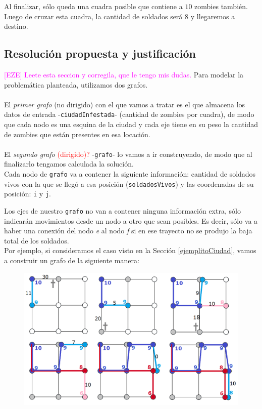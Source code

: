 Al finalizar, s\'olo queda una cuadra posible que contiene a $10$ zombies tambi\'en. Luego de cruzar esta cuadra, la cantidad de soldados ser\'a $8$ y llegaremos a destino.



\newpage
\subsection{Resoluci\'on propuesta y justificaci\'on}

\textcolor{magenta}{[EZE] Leete esta seccion y corregila, que le tengo mis dudas. }Para modelar la problem\'atica planteada, utilizamos dos grafos.\\
\\

El \emph{primer grafo} (no dirigido) con el que vamos a tratar es el que almacena los datos de entrada -\texttt{ciudadInfestada}- (cantidad de zombies por cuadra), de modo que cada nodo es una esquina de la ciudad y cada eje tiene en su peso la cantidad de zombies que est\'an presentes en esa locaci\'on.\\
\\

El \emph{segundo grafo} \textcolor{red}{(dirigido)?} -\texttt{grafo}- lo vamos a ir construyendo, de modo que al finalizarlo tengamos calculada la soluci\'on.\\

Cada nodo de \texttt{grafo} va a contener la siguiente informaci\'on: cantidad de soldados vivos con la que se lleg\'o a esa posici\'on (\texttt{soldadosVivos}) y las coordenadas de su posici\'on: \texttt{i} y \texttt{j}.

Los ejes de nuestro \texttt{grafo} no van a contener ninguna informaci\'on extra, s\'olo indicar\'an movimientos desde un nodo a otro que sean posibles. Es decir, s\'olo va a haber una conexi\'on del nodo \emph{e} al nodo \emph{f} si en ese trayecto no se produjo la baja total de los soldados.\\

Por ejemplo, si consideramos el caso visto en la Secci\'on \ref{ejemplitoCiudad}, vamos a construir un grafo de la siguiente manera:

  \begin{figure}[h!]
   \begin{center}
 	\includegraphics[scale=0.4]{imagenes/ej2/todos.png}
   \end{center}
 \end{figure}
 
